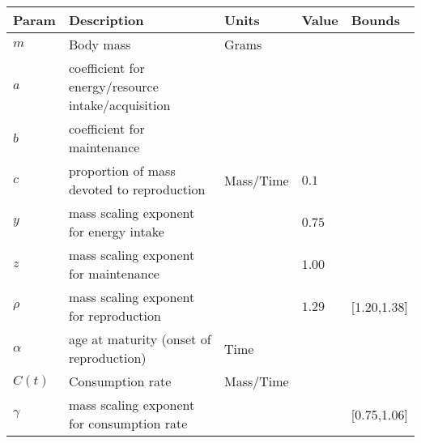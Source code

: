 \documentclass[a4paper]{article} %
\begin{document}
\begin{table}
    \begin{tabularx}{\linewidth}{|l|X|l|X|l|}
    \hline
    Param               & Description                                                       & Units                     & Value                                         & Bounds        \\ \hline
    $m$                 & Body mass                                                         & Grams                     &                                               &               \\ \hline
    $a$                 & coefficient for energy/resource intake/acquisition                &                           &                                               &               \\ \hline
    $b$                 & coefficient for maintenance                                       &                           &                                               &               \\ \hline
    $c$                 & proportion of mass devoted to reproduction                        & Mass/Time                 & $0.1$ \autocite{peters1983,Blueweiss1978}     &                \\ \hline
    $y$                 & mass scaling exponent for energy intake                           &                           & $0.75$                                        &               \\ \hline
    $z$                 & mass scaling exponent for maintenance                             &                           & $1.00$                                        &               \\ \hline
    $\rho$              & mass scaling exponent for reproduction                            &                           & $1.29$ \autocite{Barneche2018d}               & [1.20,1.38]   \\ \hline
    $\alpha$            & age at maturity (onset of reproduction)                           & Time                      &                                               &               \\ \hline
    $C(t)$              & Consumption rate                                                  & Mass/Time                 &                                               &               \\ \hline
    $\gamma$            & mass scaling exponent for consumption rate                        &                           &                                               & [0.75,1.06]   \\ \hline

\end{tabularx}
\end{table}
\end{document}

